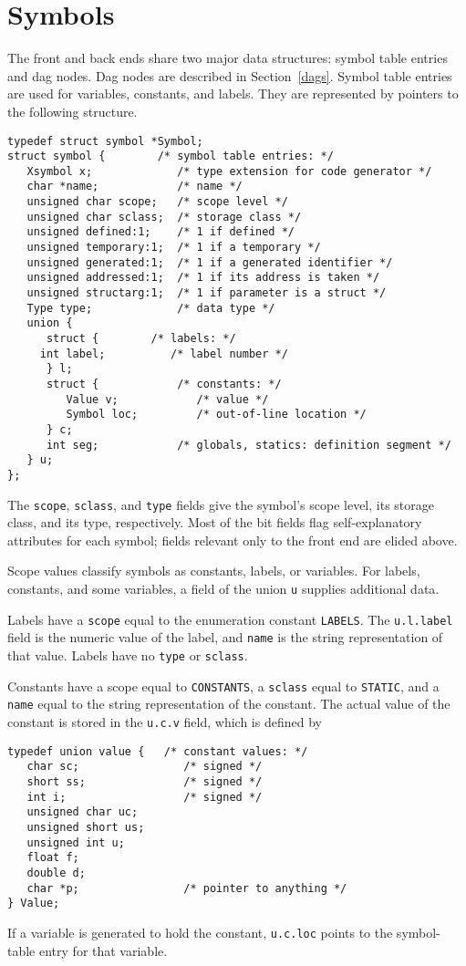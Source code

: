 \section{Symbols}

\label{symbols}
The front and back ends share two major data structures: symbol table
entries and dag nodes. Dag nodes are described in Section~\ref{dags}.
Symbol table entries are used for variables, constants, and labels.
They are represented by pointers to the following structure.
\begin{verbatim}
typedef struct symbol *Symbol;
struct symbol {        /* symbol table entries: */
   Xsymbol x;             /* type extension for code generator */
   char *name;            /* name */
   unsigned char scope;   /* scope level */
   unsigned char sclass;  /* storage class */
   unsigned defined:1;    /* 1 if defined */
   unsigned temporary:1;  /* 1 if a temporary */
   unsigned generated:1;  /* 1 if a generated identifier */
   unsigned addressed:1;  /* 1 if its address is taken */
   unsigned structarg:1;  /* 1 if parameter is a struct */
   Type type;             /* data type */
   union {
      struct {		  /* labels: */
	 int label;          /* label number */
      } l;
      struct {            /* constants: */
         Value v;            /* value */
         Symbol loc;         /* out-of-line location */
      } c;
      int seg;            /* globals, statics: definition segment */
   } u;
};
\end{verbatim}
The \verb|scope|, \verb|sclass|, and \verb|type| fields give the symbol's
scope level, its storage class, and its type, respectively.
Most of the bit fields flag self-explanatory attributes for each symbol;
fields relevant only to the front end are elided above.

Scope values classify symbols as constants, labels, or variables.
For labels, constants, and some variables,
a field of the union \verb|u| supplies additional data.

Labels have a \verb|scope| equal to the enumeration constant \verb|LABELS|.
The \verb|u.l.label| field is the numeric value of the label,
and \verb|name| is the string representation of that value.
Labels have no \verb|type| or \verb|sclass|.

Constants have a scope equal to \verb|CONSTANTS|, a \verb|sclass| equal
to \verb|STATIC|, and a \verb|name|
equal to the string representation of the constant.
The actual value of the constant is stored in the \verb|u.c.v| field,
which is defined by
\begin{verbatim}
typedef union value {   /* constant values: */
   char sc;                /* signed */
   short ss;               /* signed */
   int i;                  /* signed */
   unsigned char uc;
   unsigned short us;
   unsigned int u;
   float f;
   double d;
   char *p;                /* pointer to anything */
} Value;
\end{verbatim}
If a variable is generated to hold the constant,
\verb|u.c.loc| points to the symbol-table entry for that variable.

